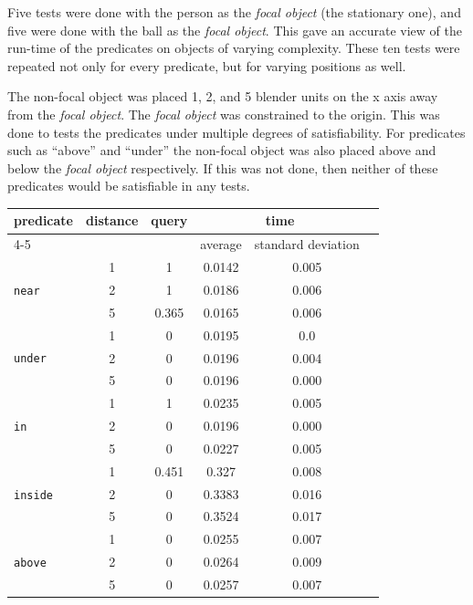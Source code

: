 Five tests were done with the person as the \emph{focal object} (the stationary one), and five were done with the ball as the \emph{focal object}.
This gave an accurate view of the run-time of the predicates on objects of varying complexity.
These ten tests were repeated not only for every predicate, but for varying positions as well. 

The non-focal object was placed 1, 2, and 5 blender units on the x axis away from the \emph{focal object}.
The \emph{focal object} was constrained to the origin.
This was done to tests the predicates under multiple degrees of satisfiability.
For predicates such as ``above'' and ``under'' the non-focal object was also placed above and below the \emph{focal object} respectively.
If this was not done, then neither of these predicates would be satisfiable in any tests.
\begin{table}[h]
	\centering
	\begin{tabular}{|l | c | c | c | c | c |}
		\hline
		\multirow{3}{*}{predicate} & \multirow{3}{*}{distance} & \multirow{3}{*}{query} &  \multicolumn{2}{c|}{time} \\\cline{4-5}
		&  &  & average & standard deviation \\\hline
		\multirow{3}{*}{\texttt{near}} & 1 & 1 & 0.0142 & 0.005 \\\cline{2-5}
		& 2 & 1 & 0.0186 & 0.006 \\\cline{2-5}
		& 5 & 0.365 & 0.0165 & 0.006 \\\hline
		\multirow{3}{*}{\texttt{under}} & 1 & 0 & 0.0195 & 0.0 \\\cline{2-5}
		& 2 & 0 & 0.0196 & 0.004 \\\cline{2-5}
		& 5 & 0 & 0.0196 & 0.000 \\\hline
		\multirow{3}{*}{\texttt{in}} & 1 & 1 & 0.0235 & 0.005 \\\cline{2-5}
		& 2 & 0 & 0.0196 & 0.000 \\\cline{2-5}
		& 5 & 0 & 0.0227 & 0.005 \\\hline
		\multirow{3}{*}{\texttt{inside}} & 1 & 0.451 & 0.327 & 0.008 \\\cline{2-5}
		& 2 & 0 & 0.3383 & 0.016 \\\cline{2-5}
		& 5 & 0 & 0.3524 & 0.017 \\\hline 
		\multirow{3}{*}{\texttt{above}} & 1 & 0 & 0.0255 & 0.007 \\\cline{2-5}
		& 2 & 0 & 0.0264 & 0.009 \\\cline{2-5}
		& 5 & 0 & 0.0257 & 0.007 \\\hline 

\end{tabular}
\end{table}
